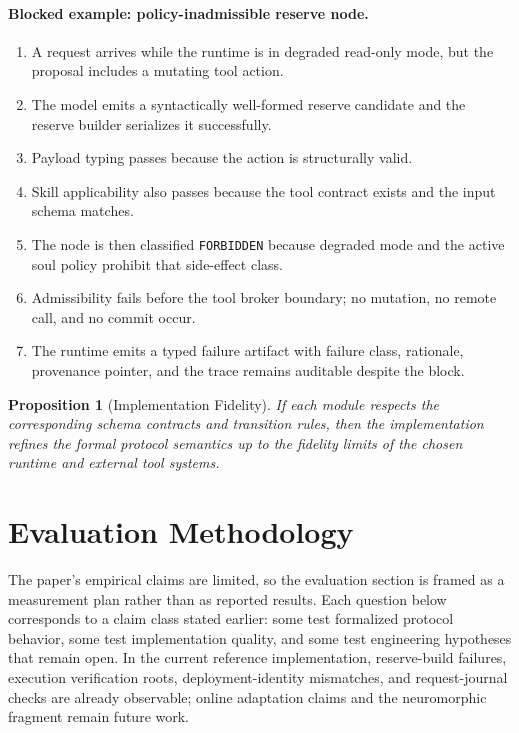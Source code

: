 \documentclass[11pt]{article}
\newtheorem{proposition}{Proposition}[section]
\theoremstyle{remark}
\begin{document}
\paragraph{Blocked example: policy-inadmissible reserve node.}
\begin{enumerate}[leftmargin=1.5em]
    \item A request arrives while the runtime is in degraded read-only mode, but the proposal includes a mutating tool action.
    \item The model emits a syntactically well-formed reserve candidate and the reserve builder serializes it successfully.
    \item Payload typing passes because the action is structurally valid.
    \item Skill applicability also passes because the tool contract exists and the input schema matches.
    \item The node is then classified \texttt{FORBIDDEN} because degraded mode and the active soul policy prohibit that side-effect class.
    \item Admissibility fails before the tool broker boundary; no mutation, no remote call, and no commit occur.
    \item The runtime emits a typed failure artifact with failure class, rationale, provenance pointer, and the trace remains auditable despite the block.
\end{enumerate}

\begin{proposition}[Implementation Fidelity]
If each module respects the corresponding schema contracts and transition rules, then the implementation refines the formal protocol semantics up to the fidelity limits of the chosen runtime and external tool systems.
\end{proposition}

\section{Evaluation Methodology}\label{sec:evaluation}

The paper's empirical claims are limited, so the evaluation section is framed as a measurement plan rather than as reported results. Each question below corresponds to a claim class stated earlier: some test formalized protocol behavior, some test implementation quality, and some test engineering hypotheses that remain open. In the current reference implementation, reserve-build failures, execution verification roots, deployment-identity mismatches, and request-journal checks are already observable; online adaptation claims and the neuromorphic fragment remain future work.
\end{document}
